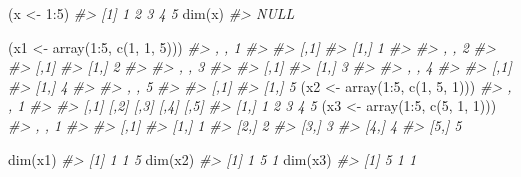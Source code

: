 \documentclass[
]{book}
\newenvironment{Shaded}{\begin{snugshade}}{\end{snugshade}}
\newcommand{\CommentTok}[1]{\textcolor[rgb]{0.56,0.35,0.01}{\textit{#1}}}
\newcommand{\DecValTok}[1]{\textcolor[rgb]{0.00,0.00,0.81}{#1}}
\newcommand{\FunctionTok}[1]{\textcolor[rgb]{0.00,0.00,0.00}{#1}}
\newcommand{\NormalTok}[1]{#1}
\newcommand{\OtherTok}[1]{\textcolor[rgb]{0.56,0.35,0.01}{#1}}
\newcommand{\SpecialCharTok}[1]{\textcolor[rgb]{0.00,0.00,0.00}{#1}}
\begin{document}
\begin{Shaded}
\begin{Highlighting}[]
\NormalTok{(x }\OtherTok{\textless{}{-}} \DecValTok{1}\SpecialCharTok{:}\DecValTok{5}\NormalTok{)}
\CommentTok{\#\textgreater{} [1] 1 2 3 4 5}
\FunctionTok{dim}\NormalTok{(x)}
\CommentTok{\#\textgreater{} NULL}

\NormalTok{(x1 }\OtherTok{\textless{}{-}} \FunctionTok{array}\NormalTok{(}\DecValTok{1}\SpecialCharTok{:}\DecValTok{5}\NormalTok{, }\FunctionTok{c}\NormalTok{(}\DecValTok{1}\NormalTok{, }\DecValTok{1}\NormalTok{, }\DecValTok{5}\NormalTok{)))}
\CommentTok{\#\textgreater{} , , 1}
\CommentTok{\#\textgreater{} }
\CommentTok{\#\textgreater{}      [,1]}
\CommentTok{\#\textgreater{} [1,]    1}
\CommentTok{\#\textgreater{} }
\CommentTok{\#\textgreater{} , , 2}
\CommentTok{\#\textgreater{} }
\CommentTok{\#\textgreater{}      [,1]}
\CommentTok{\#\textgreater{} [1,]    2}
\CommentTok{\#\textgreater{} }
\CommentTok{\#\textgreater{} , , 3}
\CommentTok{\#\textgreater{} }
\CommentTok{\#\textgreater{}      [,1]}
\CommentTok{\#\textgreater{} [1,]    3}
\CommentTok{\#\textgreater{} }
\CommentTok{\#\textgreater{} , , 4}
\CommentTok{\#\textgreater{} }
\CommentTok{\#\textgreater{}      [,1]}
\CommentTok{\#\textgreater{} [1,]    4}
\CommentTok{\#\textgreater{} }
\CommentTok{\#\textgreater{} , , 5}
\CommentTok{\#\textgreater{} }
\CommentTok{\#\textgreater{}      [,1]}
\CommentTok{\#\textgreater{} [1,]    5}
\NormalTok{(x2 }\OtherTok{\textless{}{-}} \FunctionTok{array}\NormalTok{(}\DecValTok{1}\SpecialCharTok{:}\DecValTok{5}\NormalTok{, }\FunctionTok{c}\NormalTok{(}\DecValTok{1}\NormalTok{, }\DecValTok{5}\NormalTok{, }\DecValTok{1}\NormalTok{)))}
\CommentTok{\#\textgreater{} , , 1}
\CommentTok{\#\textgreater{} }
\CommentTok{\#\textgreater{}      [,1] [,2] [,3] [,4] [,5]}
\CommentTok{\#\textgreater{} [1,]    1    2    3    4    5}
\NormalTok{(x3 }\OtherTok{\textless{}{-}} \FunctionTok{array}\NormalTok{(}\DecValTok{1}\SpecialCharTok{:}\DecValTok{5}\NormalTok{, }\FunctionTok{c}\NormalTok{(}\DecValTok{5}\NormalTok{, }\DecValTok{1}\NormalTok{, }\DecValTok{1}\NormalTok{)))}
\CommentTok{\#\textgreater{} , , 1}
\CommentTok{\#\textgreater{} }
\CommentTok{\#\textgreater{}      [,1]}
\CommentTok{\#\textgreater{} [1,]    1}
\CommentTok{\#\textgreater{} [2,]    2}
\CommentTok{\#\textgreater{} [3,]    3}
\CommentTok{\#\textgreater{} [4,]    4}
\CommentTok{\#\textgreater{} [5,]    5}

\FunctionTok{dim}\NormalTok{(x1)}
\CommentTok{\#\textgreater{} [1] 1 1 5}
\FunctionTok{dim}\NormalTok{(x2)}
\CommentTok{\#\textgreater{} [1] 1 5 1}
\FunctionTok{dim}\NormalTok{(x3)}
\CommentTok{\#\textgreater{} [1] 5 1 1}
\end{Highlighting}
\end{Shaded}
\end{document}

